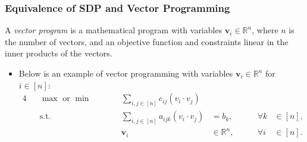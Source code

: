 \documentclass{beamer}
\newcommand{\RR}{\mathbb{R}}
\begin{document}
    \begin{frame}
        \frametitle{Equivalence of SDP and Vector Programming}
    
        \begin{definition}
            A \emph{vector program} is a mathematical program with variables $\mathbf v_i \in \RR^n$, where $n$ is the number of vectors, and an objective function and constraints linear in the inner products of the vectors.
        \end{definition}

        \pause

        \begin{itemize}
            \item Below is an example of vector programming with variables $\mathbf v_i \in \RR^n$ for $i \in [n]$:
            \begin{alignat}{4}
                && \max \text{ or } \min \qquad && \sum_{i, j \in [n]} c_{ij} \left(v_i \cdot v_j\right) \label{example:vector-program} \\
                && \text{s.t.} \qquad && \sum_{i, j \in [n]} a_{ijk} \left(v_i \cdot v_j\right) &= b_k, & \qquad \forall k & \in [n], \nonumber \\
                && && \mathbf v_i &\in \RR^n, & \qquad \forall i & \in [n]. \nonumber
              \end{alignat}
        \end{itemize}
    \end{frame}
\end{document}
